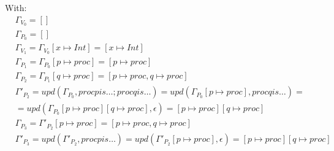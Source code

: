 \documentclass[12pt,fleqn]{article}		%
\begin{document}
With:
\begin{align*}
& \Gamma_{V_0} = []\\
& \Gamma_{P_0} = []\\
& \Gamma_{V_1} = \Gamma_{V_0}[x \mapsto Int] = [x \mapsto Int]\\
& \Gamma_{P_1} = \Gamma_{P_0}[p \mapsto proc] = [p \mapsto proc]\\
& \Gamma_{P_2} = \Gamma_{P_1}[q \mapsto proc] = [p \mapsto proc, q \mapsto proc]\\
& \Gamma'_{P_2} = upd(\Gamma_{P_0}, proc p is \ldots; proc q is \ldots) = upd(\Gamma_{P_0}[p \mapsto proc], proc q is \ldots) =\\
& = upd(\Gamma_{P_0}[p \mapsto proc][q \mapsto proc], \epsilon) = [p \mapsto proc][q \mapsto proc]\\
& \Gamma_{P_3} = \Gamma'_{P_2}[p \mapsto proc] = [p \mapsto proc, q \mapsto proc]\\
& \Gamma'_{P_3} = upd(\Gamma'_{P_2}, proc p is \ldots) = upd(\Gamma'_{P_2}[p \mapsto proc], \epsilon) = [p \mapsto proc][q \mapsto proc]\\
\end{align*}
\end{document}
